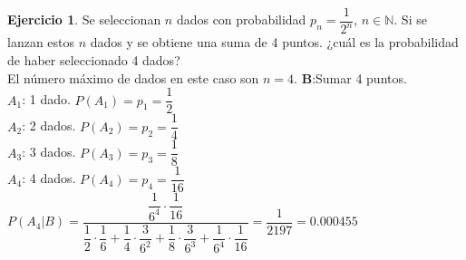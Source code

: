 \documentclass[a4paper, 12pt]{article}
\theoremstyle{definition}
\newtheorem{ej}{Ejercicio}
\begin{document}
\begin{ej}
Se seleccionan $n$ dados con probabilidad $p_n = \dfrac{1}{2^n}$, $n \in \mathbb{N}$. Si se lanzan estos $n$ dados y se obtiene una suma de 4 puntos. ¿cuál es la probabilidad de haber seleccionado 4 dados?\\
El número máximo de dados en este caso son $n=4$.
\textbf{B}:Sumar 4 puntos. \\
\textbf{$A_1$}: 1 dado. $P(A_1) = p_1 = \dfrac{1}{2}$\\
\textbf{$A_2$}: 2 dados. $P(A_2) = p_2 = \dfrac{1}{4}$\\
\textbf{$A_3$}: 3 dados. $P(A_3) = p_3 = \dfrac{1}{8}$\\
\textbf{$A_4$}: 4 dados. $P(A_4) = p_4 = \dfrac{1}{16}$\\
$P(A_4|B) = \dfrac{\dfrac{1}{6^4}\cdot\dfrac{1}{16}}{\dfrac{1}{2}\cdot\dfrac{1}{6} + \dfrac{1}{4}\cdot\dfrac{3}{6^2} + \dfrac{1}{8}\cdot\dfrac{3}{6^3} + \dfrac{1}{6^4}\cdot\dfrac{1}{16}} = \dfrac{1}{2197} = 0.000455$
\end{ej}
\end{document}
